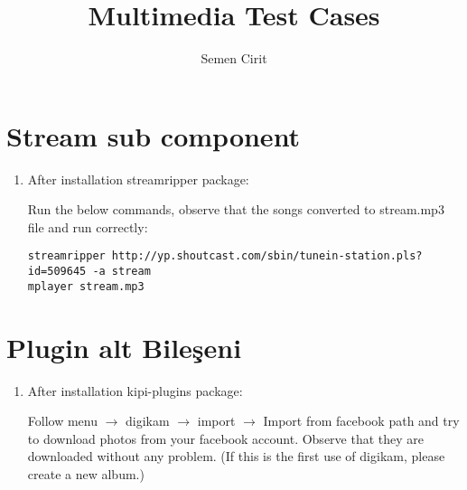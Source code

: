 \documentclass[a4paper,10pt]{article}
\title{Multimedia Test Cases}
\author{Semen Cirit}
\begin{document}
\maketitle
\section{Stream sub component}
\begin{enumerate}
 \item After installation streamripper package:

Run the below commands, observe that the songs converted to stream.mp3 file and run correctly:
\begin{verbatim}
streamripper http://yp.shoutcast.com/sbin/tunein-station.pls?id=509645 -a stream 
mplayer stream.mp3
\end{verbatim}

\end{enumerate}


\section{Plugin alt Bileşeni}
\begin{enumerate}
 \item After installation kipi-plugins package:

Follow menu $\rightarrow$ digikam $\rightarrow$ import $\rightarrow$ Import from facebook path and try to download photos from your facebook account. Observe that they are downloaded without any problem. (If this is the first use of digikam, please create a new album.)
\end{enumerate}
\end{document}
